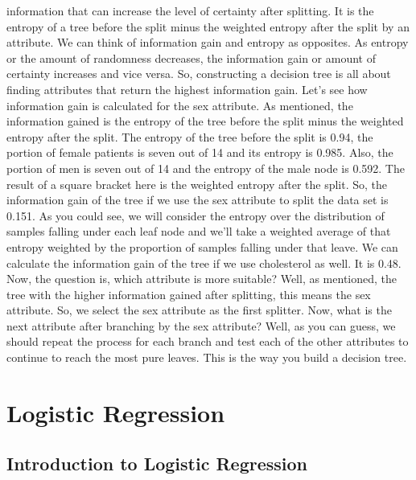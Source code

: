 information that can increase the level of certainty after splitting. It is the entropy of a tree before the split minus the weighted entropy after the split by an attribute. We can think of information gain and entropy as opposites. As entropy or the amount of randomness decreases, the information gain or amount of certainty increases and vice versa. So, constructing a decision tree is all about finding attributes that return the highest information gain. Let's see how information gain is calculated for the sex attribute. As mentioned, the information gained is the entropy of the tree before the split minus the weighted entropy after the split. The entropy of the tree before the split is 0.94, the portion of female patients is seven out of 14 and its entropy is 0.985. Also, the portion of men is seven out of 14 and the entropy of the male node is 0.592. The result of a square bracket here is the weighted entropy after the split. So, the information gain of the tree if we use the sex attribute to split the data set is 0.151. As you could see, we will consider the entropy over the distribution of samples falling under each leaf node and we'll take a weighted average of that entropy weighted by the proportion of samples falling under that leave. We can calculate the information gain of the tree if we use cholesterol as well. It is 0.48. Now, the question is, which attribute is more suitable? Well, as mentioned, the tree with the higher information gained after splitting, this means the sex attribute. So, we select the sex attribute as the first splitter. Now, what is the next attribute after branching by the sex attribute? Well, as you can guess, we should repeat the process for each branch and test each of the other attributes to continue to reach the most pure leaves. This is the way you build a decision tree.

\section{Logistic Regression}
	
	\subsection{Introduction to Logistic Regression}
	
